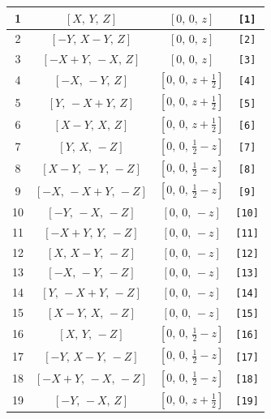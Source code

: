 \documentclass[fleqn,8pt]{jsarticle}
\begin{document}
\begin{longtable}{cccc}
1 & $\left[ X,\, Y,\, Z \right]$ & $\left[ 0,\, 0,\, z \right]$ & {\tt [1]} \\ \hline
2 & $\left[ - Y,\, X - Y,\, Z \right]$ & $\left[ 0,\, 0,\, z \right]$ & {\tt [2]} \\ \hline
3 & $\left[ - X + Y,\, - X,\, Z \right]$ & $\left[ 0,\, 0,\, z \right]$ & {\tt [3]} \\ \hline
4 & $\left[ - X,\, - Y,\, Z \right]$ & $\left[ 0,\, 0,\, z + \frac{1}{2} \right]$ & {\tt [4]} \\ \hline
5 & $\left[ Y,\, - X + Y,\, Z \right]$ & $\left[ 0,\, 0,\, z + \frac{1}{2} \right]$ & {\tt [5]} \\ \hline
6 & $\left[ X - Y,\, X,\, Z \right]$ & $\left[ 0,\, 0,\, z + \frac{1}{2} \right]$ & {\tt [6]} \\ \hline
7 & $\left[ Y,\, X,\, - Z \right]$ & $\left[ 0,\, 0,\, \frac{1}{2} - z \right]$ & {\tt [7]} \\ \hline
8 & $\left[ X - Y,\, - Y,\, - Z \right]$ & $\left[ 0,\, 0,\, \frac{1}{2} - z \right]$ & {\tt [8]} \\ \hline
9 & $\left[ - X,\, - X + Y,\, - Z \right]$ & $\left[ 0,\, 0,\, \frac{1}{2} - z \right]$ & {\tt [9]} \\ \hline
10 & $\left[ - Y,\, - X,\, - Z \right]$ & $\left[ 0,\, 0,\, - z \right]$ & {\tt [10]} \\ \hline
11 & $\left[ - X + Y,\, Y,\, - Z \right]$ & $\left[ 0,\, 0,\, - z \right]$ & {\tt [11]} \\ \hline
12 & $\left[ X,\, X - Y,\, - Z \right]$ & $\left[ 0,\, 0,\, - z \right]$ & {\tt [12]} \\ \hline
13 & $\left[ - X,\, - Y,\, - Z \right]$ & $\left[ 0,\, 0,\, - z \right]$ & {\tt [13]} \\ \hline
14 & $\left[ Y,\, - X + Y,\, - Z \right]$ & $\left[ 0,\, 0,\, - z \right]$ & {\tt [14]} \\ \hline
15 & $\left[ X - Y,\, X,\, - Z \right]$ & $\left[ 0,\, 0,\, - z \right]$ & {\tt [15]} \\ \hline
16 & $\left[ X,\, Y,\, - Z \right]$ & $\left[ 0,\, 0,\, \frac{1}{2} - z \right]$ & {\tt [16]} \\ \hline
17 & $\left[ - Y,\, X - Y,\, - Z \right]$ & $\left[ 0,\, 0,\, \frac{1}{2} - z \right]$ & {\tt [17]} \\ \hline
18 & $\left[ - X + Y,\, - X,\, - Z \right]$ & $\left[ 0,\, 0,\, \frac{1}{2} - z \right]$ & {\tt [18]} \\ \hline
19 & $\left[ - Y,\, - X,\, Z \right]$ & $\left[ 0,\, 0,\, z + \frac{1}{2} \right]$ & {\tt [19]} \\ \hline

\end{longtable}
\end{document}

